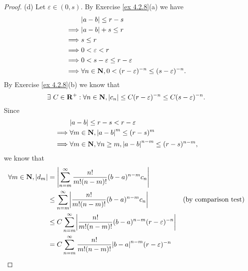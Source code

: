 \begin{proof}{(d)}
    Let \(\varepsilon \in (0, s)\).
    By Exercise \ref{ex 4.2.8}(a) we have
    \begin{align*}
                 & \abs{a - b} \leq r - s                                                    \\
        \implies & \abs{a - b} + s \leq r                                                    \\
        \implies & s \leq r                                                                  \\
        \implies & 0 < \varepsilon < r                                                       \\
        \implies & 0 < s - \varepsilon \leq r - \varepsilon                                  \\
        \implies & \forall n \in \N, 0 < (r - \varepsilon)^{-n} \leq (s - \varepsilon)^{-n}.
    \end{align*}
    By Exercise \ref{ex 4.2.8}(b) we know that
    \[
        \exists\ C \in \mathbf{R}^+ : \forall n \in \mathbf{N}, \left\lvert c_n\right\rvert \leq C (r - \varepsilon)^{-n} \leq C (s - \varepsilon)^{-n}.
    \]
    Since
    \begin{align*}
                 & \abs{a - b} \leq r - s < r - \varepsilon                                      \\
        \implies & \forall m \in \N, \abs{a - b}^{m} \leq (r - s)^m                              \\
        \implies & \forall m \in \N, \forall n \geq m, \abs{a - b}^{n - m} \leq (r - s)^{n - m},
    \end{align*}
    we know that
    \begin{align*}
        \forall m \in \N, \abs{d_m} & = \abs{\sum_{n = m}^\infty \frac{n!}{m! (n - m)!} (b - a)^{n - m} c_n}                                                            \\
                                    & \leq \sum_{n = m}^\infty \abs{\frac{n!}{m! (n - m)!} (b - a)^{n - m} c_n}                      & \text{(by comparison test)}      \\
                                    & \leq C \sum_{n = m}^\infty \abs{\frac{n!}{m! (n - m)!} (b - a)^{n - m} (r - \varepsilon)^{-n}}                                    \\
                                    & = C \sum_{n = m}^\infty \frac{n!}{m! (n - m)!} \abs{b - a}^{n - m} (r - \varepsilon)^{-n}                                         \\

\end{align*}
\end{proof}
